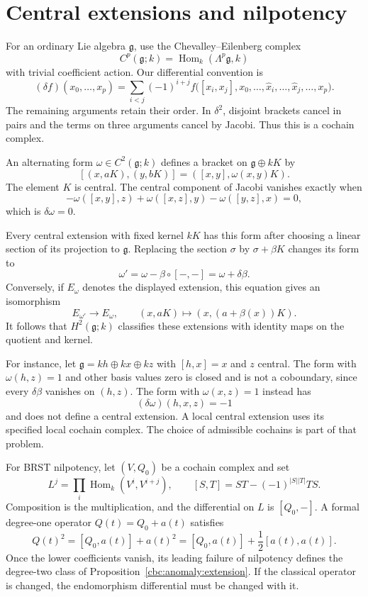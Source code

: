 \section{Central extensions and nilpotency}

For an ordinary Lie algebra $\mathfrak g$, use the Chevalley--Eilenberg complex
\[
 C^p(\mathfrak g;k)=\operatorname{Hom}_k(\Lambda^p\mathfrak g,k)
\]
with trivial coefficient action.
Our differential convention is
\[
 (\delta f)(x_0,\ldots,x_p)
 =\sum_{i<j}(-1)^{i+j}
 f\bigl([x_i,x_j],x_0,\ldots,\widehat x_i,\ldots,
                    \widehat x_j,\ldots,x_p\bigr).
\]
The remaining arguments retain their order.
In $\delta^2$, disjoint brackets cancel in pairs and the terms on three arguments cancel by Jacobi.
Thus this is a cochain complex.

An alternating form $\omega\in C^2(\mathfrak g;k)$ defines a bracket on $\mathfrak g\oplus kK$ by
\[
 [(x,aK),(y,bK)]=([x,y],\omega(x,y)K).
\]
The element $K$ is central.
The central component of Jacobi vanishes exactly when
\[
 -\omega([x,y],z)+\omega([x,z],y)-\omega([y,z],x)=0,
\]
which is $\delta\omega=0$.

Every central extension with fixed kernel $kK$ has this form after choosing a linear section of its projection to $\mathfrak g$.
Replacing the section $\sigma$ by $\sigma+\beta K$ changes its form to
\[
 \omega'=\omega-\beta\circ[-,-]=\omega+\delta\beta.
\]
Conversely, if $E_\omega$ denotes the displayed extension, this equation gives an isomorphism
\[
 E_{\omega'}\longrightarrow E_\omega,
 \qquad (x,aK)\longmapsto(x,(a+\beta(x))K).
\]
It follows that $H^2(\mathfrak g;k)$ classifies these extensions with identity maps on the quotient and kernel.

For instance, let $\mathfrak g=kh\oplus kx\oplus kz$ with $[h,x]=x$ and $z$ central.
The form with $\omega(h,z)=1$ and other basis values zero is closed and is not a coboundary, since every $\delta\beta$ vanishes on $(h,z)$.
The form with $\omega(x,z)=1$ instead has
\[
 (\delta\omega)(h,x,z)=-1
\]
and does not define a central extension.
A local central extension uses its specified local cochain complex.
The choice of admissible cochains is part of that problem.

For BRST nilpotency, let $(V,Q_0)$ be a cochain complex and set
\[
 L^j=\prod_i\operatorname{Hom}_k(V^i,V^{i+j}),
 \qquad [S,T]=ST-(-1)^{|S||T|}TS.
\]
Composition is the multiplication, and the differential on $L$ is $[Q_0,-]$.
A formal degree-one operator $Q(t)=Q_0+a(t)$ satisfies
\[
 Q(t)^2=[Q_0,a(t)]+a(t)^2
       =[Q_0,a(t)]+\frac12[a(t),a(t)].
\]
Once the lower coefficients vanish, its leading failure of nilpotency defines the degree-two class of Proposition~\ref{cbc:anomaly:extension}.
If the classical operator is changed, the endomorphism differential must be changed with it.

